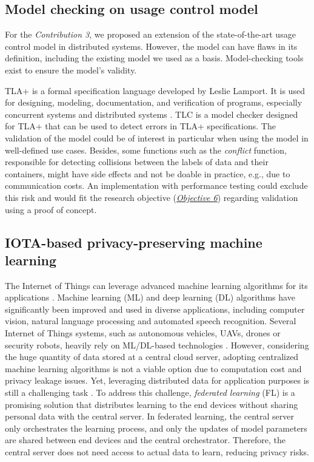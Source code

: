 \subsection{Model checking on usage control model} 
For the \emph{Contribution 3}, we proposed an extension of the state-of-the-art usage control model in distributed systems. However, the model can have flaws in its definition, including the existing model we used as a basis. Model-checking tools exist to ensure the model's validity.

 TLA+ is a formal specification language developed by Leslie Lamport. It is used for designing, modeling, documentation, and verification of programs, especially concurrent systems and distributed systems \cite{Lamport1992}. TLC is a model checker designed for TLA+ that can be used to detect errors in TLA+ specifications.
 The validation of the model could be of interest in particular when using the model in well-defined use cases. Besides, some functions such as the \emph{conflict} function, responsible for detecting collisions between the labels of data and their containers, might have side effects and not be doable in practice, e.g., due to communication costs. An implementation with performance testing could exclude this risk and would fit the research objective (\hyperref[obj:56]{\emph{Objective 6}}) regarding validation using a proof of concept. 
 
\subsection{IOTA-based privacy-preserving machine learning}
 The Internet of Things can leverage advanced machine learning algorithms for its applications \cite{Ali2021}. Machine learning (ML) and deep learning (DL) algorithms have significantly been improved and used in diverse applications, including computer vision, natural language processing and automated speech recognition. Several Internet of Things systems, such as autonomous vehicles, UAVs, drones or security robots, heavily rely on ML/DL-based technologies \cite{Jiang2022}. However, considering the huge quantity of data stored at a central cloud server, adopting centralized machine learning algorithms is not a viable option due to computation cost and privacy leakage issues. Yet, leveraging distributed data for application purposes is still a challenging task \cite{Ali2021}. To address this challenge, \emph{federated learning} (FL) is a promising solution that distributes learning to the end devices without sharing personal data with the central server. In federated learning, the central server only orchestrates the learning process, and only the updates of model parameters are shared between end devices and the central orchestrator. Therefore, the central server does not need access to actual data to learn, reducing privacy risks.
 
